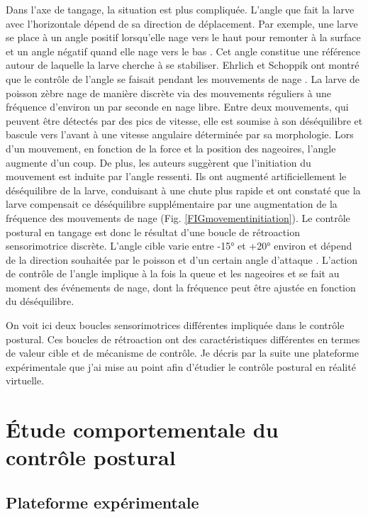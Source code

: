 Dans l'axe de tangage, la situation est plus compliquée. L'angle que fait la larve avec l'horizontale dépend de sa direction de déplacement. Par exemple, une larve se place à un angle positif lorsqu'elle nage vers le haut pour remonter à la surface et un angle négatif quand elle nage vers le bas \cite{ehrlich_primal_2019}. Cet angle constitue une référence autour de laquelle la larve cherche à se stabiliser. Ehrlich et Schoppik ont montré que le contrôle de l'angle se faisait pendant les mouvements de nage \cite{ehrlich_control_2017}. La larve de poisson zèbre nage de manière discrète via des mouvements réguliers à une fréquence d'environ un par seconde en nage libre. Entre deux mouvements, qui peuvent être détectés par des pics de vitesse, elle est soumise à son déséquilibre et bascule vers l'avant à une vitesse angulaire déterminée par sa morphologie. Lors d'un mouvement, en fonction de la force et la position des nageoires, l'angle augmente d'un coup. De plus, les auteurs suggèrent que l'initiation du mouvement est induite par l'angle ressenti. Ils ont augmenté artificiellement le déséquilibre de la larve, conduisant à une chute plus rapide et ont constaté que la larve compensait ce déséquilibre supplémentaire par une augmentation de la fréquence des mouvements de nage (Fig. \ref{FIGmovementinitiation}).
Le contrôle postural en tangage est donc le résultat d'une boucle de rétroaction sensorimotrice discrète. L'angle cible varie entre -15° et +20° environ et dépend de la direction souhaitée par le poisson et d'un certain angle d'attaque \cite{ehrlich_primal_2019}. L'action de contrôle de l'angle implique à la fois la queue et les nageoires et se fait au moment des événements de nage, dont la fréquence peut être ajustée en fonction du déséquilibre.

On voit ici deux boucles sensorimotrices différentes impliquée dans le contrôle postural. Ces boucles de rétroaction ont des caractéristiques différentes en termes de valeur cible et de mécanisme de contrôle. Je décris par la suite une plateforme expérimentale que j'ai mise au point afin d'étudier le contrôle postural en réalité virtuelle.

\section{Étude comportementale du contrôle postural}

\subsection{Plateforme expérimentale}

